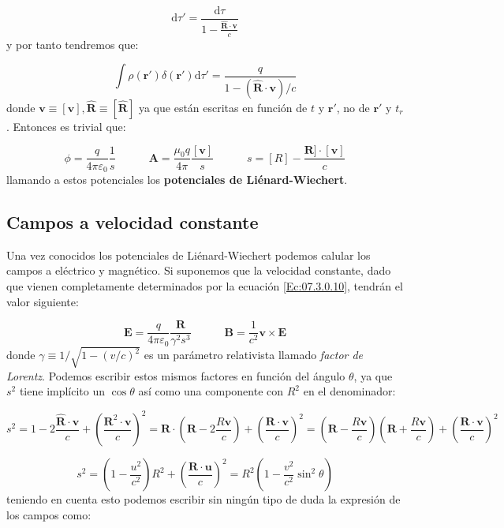 \documentclass[12pt,a4paper]{article}
\newcommand{\parentesis}[1]{\left( #1  \right)}
\newcommand{\D}{\mathrm{d}}
\newcommand{\tquad}{\quad \quad \quad}
\newcommand{\Bn}{\mathbf{B}}
\newcommand{\En}{\mathbf{E}}
\newcommand{\vn}{\mathbf{v}}
\newcommand{\rn}{\mathbf{r}}
\newcommand{\An}{\mathbf{A}}
\newcommand{\un}{\mathbf{u}}
\newcommand{\Rn}{\mathbf{R}}
\newcommand{\hnR}{\hat{\mathbf{R}}}
\numberwithin{equation}{section}
\numberwithin{figure}{section}
\begin{document}
\begin{equation}
\D \tau' = \dfrac{\D \tau}{1 - \frac{\hnR \cdot \vn}{c}}
\end{equation}
y por tanto tendremos que:

\begin{equation}
\int \rho (\rn') \delta (\rn') \D \tau' = \dfrac{q}{1-(\hnR \cdot \vn) / c}
\end{equation}
donde $\vn \equiv [\vn], \hnR \equiv [\hnR] $ ya que están escritas en función de $t$ y $\rn'$, no de $\rn'$ y $t_r$. Entonces es trivial que:

\begin{equation}
\phi = \dfrac{q}{4 \pi  \varepsilon_0} \dfrac{1}{s} \tquad \An = \dfrac{\mu_0 q}{4 \pi} \dfrac{[\vn]}{s}  \tquad s = [R]- \dfrac{ \Rn]\cdot [\vn]}{c}
\end{equation}
llamando a estos potenciales los \textbf{potenciales de Liénard-Wiechert}. 

\subsection{Campos a velocidad constante}

Una vez conocidos los potenciales de Liénard-Wiechert podemos calular los campos a eléctrico y magnético. Si suponemos que la velocidad constante, dado que vienen completamente determinados por la ecuación \ref{Ec:07.3.0.10}, tendrán el valor siguiente:

\begin{equation}
\En = \dfrac{q}{4 \pi \varepsilon_0} \dfrac{\Rn}{\gamma^2 s^3} \tquad \Bn = \dfrac{1}{c^2} \vn \times \En 
\end{equation}
donde $\gamma \equiv 1/\sqrt{1-(v/c)^2}$ es un parámetro relativista llamado \textit{factor de Lorentz}. Podemos escribir estos mismos factores en función del ángulo $\theta$, ya que $s^2$ tiene implícito un $\cos \theta$ así como una componente con $R^2$ en el denominador:

$$ s^2 = 1-2\dfrac{\hnR \cdot \vn}{c}+ \parentesis{\dfrac{\Rn^2 \cdot \vn}{c}}^2 = \Rn \cdot \parentesis{\Rn - 2 \dfrac{R \vn}{c}} + \parentesis{\dfrac{\Rn \cdot \vn}{c}}^2 = \parentesis{\Rn - \dfrac{R \vn}{c}} \parentesis{\Rn + \dfrac{R \vn}{c}}  + \parentesis{\dfrac{\Rn \cdot \vn}{c}}^2 $$

\begin{equation}
s^2 = \parentesis{1-\dfrac{u^2}{c^2}}R^2 + \parentesis{\dfrac{\Rn \cdot \un}{c}}^2 = R^2 \parentesis{1- \dfrac{v^2}{c^2} \sin^2 \theta}
\end{equation} 
teniendo en cuenta esto podemos escribir sin ningún tipo de duda la expresión de los campos como:
\end{document}

